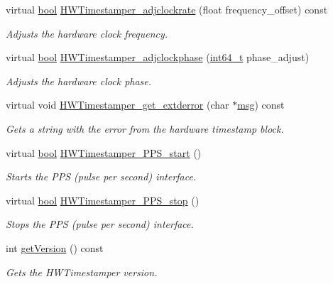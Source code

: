 \begin{DoxyCompactItemize}
virtual \hyperlink{avb__gptp_8h_af6a258d8f3ee5206d682d799316314b1}{bool} \hyperlink{class_common_timestamper_a557b905a4f8bb20481c28c8dd33cfb21}{H\+W\+Timestamper\+\_\+adjclockrate} (float frequency\+\_\+offset) const 
\begin{DoxyCompactList}\small\item\em Adjusts the hardware clock frequency. \end{DoxyCompactList}\item 
virtual \hyperlink{avb__gptp_8h_af6a258d8f3ee5206d682d799316314b1}{bool} \hyperlink{class_common_timestamper_aa9470ea1623c3718913fbff1c55e3115}{H\+W\+Timestamper\+\_\+adjclockphase} (\hyperlink{parse_8c_a67a9885ef4908cb72ce26d75b694386c}{int64\+\_\+t} phase\+\_\+adjust)
\begin{DoxyCompactList}\small\item\em Adjusts the hardware clock phase. \end{DoxyCompactList}\item 
virtual void \hyperlink{class_common_timestamper_a3b26113436dec73775d2cbc523a6e074}{H\+W\+Timestamper\+\_\+get\+\_\+extderror} (char $\ast$\hyperlink{openavb__log_8c_a0c7e58a50354c4a4d6dad428d0e47029}{msg}) const 
\begin{DoxyCompactList}\small\item\em Gets a string with the error from the hardware timestamp block. \end{DoxyCompactList}\item 
virtual \hyperlink{avb__gptp_8h_af6a258d8f3ee5206d682d799316314b1}{bool} \hyperlink{class_common_timestamper_a2cbaeb84807ca61af0bc56bcc475468d}{H\+W\+Timestamper\+\_\+\+P\+P\+S\+\_\+start} ()
\begin{DoxyCompactList}\small\item\em Starts the P\+PS (pulse per second) interface. \end{DoxyCompactList}\item 
virtual \hyperlink{avb__gptp_8h_af6a258d8f3ee5206d682d799316314b1}{bool} \hyperlink{class_common_timestamper_ac5d9f1e5eb402dffaa8897367e9fd7d3}{H\+W\+Timestamper\+\_\+\+P\+P\+S\+\_\+stop} ()
\begin{DoxyCompactList}\small\item\em Stops the P\+PS (pulse per second) interface. \end{DoxyCompactList}\item 
int \hyperlink{class_common_timestamper_a4d1414f8d9ed8d83c91769b148106307}{get\+Version} () const 
\begin{DoxyCompactList}\small\item\em Gets the H\+W\+Timestamper version. \end{DoxyCompactList}\end{DoxyCompactItemize}
